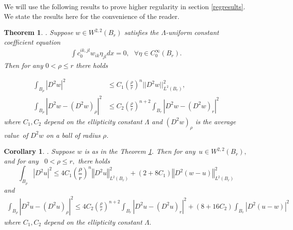 \documentclass[12pt,leqno]{amsart}%
\newtheorem{theorem}{Theorem}[section]
\theoremstyle{plain}
\newtheorem{corollary}{Corollary}[section]
\numberwithin{equation}{section}
\theoremstyle{definition}
\begin{document}
\medskip We will use the following results to prove higher regularity in
section \ref{regresults}. We state the results here for the convenience of
the reader.

\begin{theorem}
\label{five}\cite[Theorem 2.1]{BW1}. Suppose $w\in W^{2,2}(B_{r})$ satisfies
the $\Lambda$-uniform constant coefficient equation%
\begin{align*}
\int c_{0}^{ik,jl}w_{ik}\eta_{jl}dx =0, \ \ \ \forall\eta\in C_{0}^{\infty
}(B_{r}). \label{ccoef}%
\end{align*}
Then for any $0<\rho\leq r$ there holds%

\begin{align*}
\int_{B_{\rho}}|D^{2}w|^{2}  &  \leq C_{1}\left(  \frac{\rho}{r}\right)
^{n}||D^{2}w||_{L^{2}(B_{r})}^{2},\\
\int_{B_{\rho}}|D^{2}w-(D^{2}w)_{\rho}|^{2}  &  \leq C_{2}\left(  \frac{\rho
}{r}\right)  ^{n+2}\int_{B_{r}}|D^{2}w-(D^{2}w)_{r}|^{2}%
\end{align*}
where $C_{1},C_{2}$ depend on the ellipticity constant $\Lambda$ and
$(D^{2}w)_{\rho}$ is the average value\ of $D^{2}w$ on a ball of radius $\rho$.
\end{theorem}

\medskip

\begin{corollary}
\label{Cor2} \cite[Corollary 2.2]{BW1}. \textit{Suppose }$w$\textit{ is as in
the Theorem \ref{five}. Then for any~}$u\in W^{2,2}(B_{r}),$ and\textit{ for
any~} $0<\rho\leq r,$ there holds%
\[
\int_{B_{\rho}}\left\vert D^{2}u\right\vert ^{2}\leq4C_{1}\left(  \frac{\rho
}{r}\right)  ^{n}\left\Vert D^{2}u\right\Vert _{L^{2}(B_{r})}^{2}+\left(
2+8C_{1}\right)  \left\Vert D^{2}(w-u)\right\Vert _{L^{2}(B_{r})}^{2}
\label{twothree}%
\]
and
\begin{align*}
\int_{B_{\rho}}\left\vert D^{2}u-(D^{2}u)_{\rho}\right\vert ^{2} \leq
4C_{2}\left(  \frac{\rho}{r}\right)  ^{n+2}\int_{B_{r}}\left\vert
D^{2}u-(D^{2}u)_{r}\right\vert ^{2} +\left(  8+16C_{2}\right)  \int_{B_{r}%
}\left\vert D^{2}(u-w)\right\vert ^{2} \label{twofive}%
\end{align*}
where $C_{1}, C_{2}$ depend on the ellipticity constant $\Lambda.$

\begin{comment}
\textit{and \ (WHAT\ DO\ THESE\ CONSTANTS\ DEPEND\ ON?) (ALSO: Do we use the
second expression? below)}%
\begin{align}
\int_{B_{\rho}}\left\vert D^{2}u-(D^{2}u)_{\rho}\right\vert ^{2} &  \leq
4C_{2}(\rho/r)^{n+2}\int_{B_{r}}\left\vert D^{2}u-(D^{2}u)_{r}\right\vert
^{2}\nonumber\\
&  +\left(  8+16C_{2}\right)  \int_{B_{r}}\left\vert D^{2}(w-u)\right\vert
^{2}\nonumber
\end{align}
\end{comment}

\end{corollary}
\end{document}

